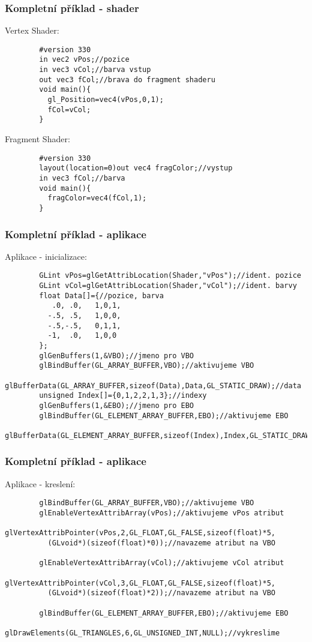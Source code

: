 \begin{frame}[fragile]
\frametitle{Kompletní příklad - shader}
		Vertex Shader:
		{\scriptsize
		\begin{verbatim}
		#version 330
		in vec2 vPos;//pozice
		in vec3 vCol;//barva vstup
		out vec3 fCol;//brava do fragment shaderu
		void main(){
		  gl_Position=vec4(vPos,0,1);
		  fCol=vCol;
		}
		\end{verbatim}
		}
		Fragment Shader:
		{\scriptsize
		\begin{verbatim}
		#version 330
		layout(location=0)out vec4 fragColor;//vystup
		in vec3 fCol;//barva
		void main(){
		  fragColor=vec4(fCol,1);
		}
		\end{verbatim}
		}
\end{frame}
%
\begin{frame}[fragile]
\frametitle{Kompletní příklad - aplikace}
		Aplikace - inicializace:
		{\scriptsize
		\begin{verbatim}
		GLint vPos=glGetAttribLocation(Shader,"vPos");//ident. pozice
		GLint vCol=glGetAttribLocation(Shader,"vCol");//ident. barvy
		float Data[]={//pozice, barva
		   .0, .0,   1,0,1,
		  -.5, .5,   1,0,0,
		  -.5,-.5,   0,1,1,
		  -1,  .0,   1,0,0
		};
		glGenBuffers(1,&VBO);//jmeno pro VBO
		glBindBuffer(GL_ARRAY_BUFFER,VBO);//aktivujeme VBO
		glBufferData(GL_ARRAY_BUFFER,sizeof(Data),Data,GL_STATIC_DRAW);//data
		unsigned Index[]={0,1,2,2,1,3};//indexy
		glGenBuffers(1,&EBO);//jmeno pro EBO
		glBindBuffer(GL_ELEMENT_ARRAY_BUFFER,EBO);//aktivujeme EBO
		glBufferData(GL_ELEMENT_ARRAY_BUFFER,sizeof(Index),Index,GL_STATIC_DRAW);
		\end{verbatim}
		}
\end{frame}

\begin{frame}[fragile]
\frametitle{Kompletní příklad - aplikace}
		Aplikace - kreslení:
		{\scriptsize
		\begin{verbatim}
		glBindBuffer(GL_ARRAY_BUFFER,VBO);//aktivujeme VBO
		glEnableVertexAttribArray(vPos);//aktivujeme vPos atribut
		glVertexAttribPointer(vPos,2,GL_FLOAT,GL_FALSE,sizeof(float)*5,
		  (GLvoid*)(sizeof(float)*0));//navazeme atribut na VBO

		glEnableVertexAttribArray(vCol);//aktivujeme vCol atribut
		glVertexAttribPointer(vCol,3,GL_FLOAT,GL_FALSE,sizeof(float)*5,
		  (GLvoid*)(sizeof(float)*2));//navazeme atribut na VBO

		glBindBuffer(GL_ELEMENT_ARRAY_BUFFER,EBO);//aktivujeme EBO
		glDrawElements(GL_TRIANGLES,6,GL_UNSIGNED_INT,NULL);//vykreslime
		\end{verbatim}
		}
\end{frame}

